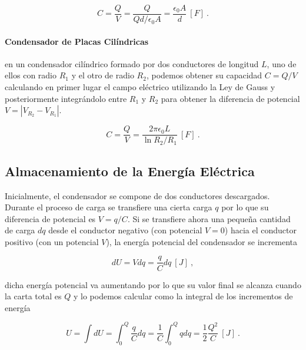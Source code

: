 \documentclass{tufte-handout}
\begin{document}
\begin{equation}
C = \frac{Q}{V} = \frac{Q}{Qd/\epsilon_0A} = \frac{\epsilon_0A}{d}~[F]~.
\end{equation}


\paragraph{Condensador de Placas Cilíndricas} en un condensador cilíndrico formado por dos conductores de longitud $L$, uno de ellos con radio $R_1$ y el otro de radio $R_2$, podemos obtener su capacidad $C = Q/V$ calculando en primer lugar el campo eléctrico utilizando la Ley de Gauss y posteriormente integrándolo entre $R_1$ y $R_2$ para obtener la diferencia de potencial $V = |V_{R_2} - V_{R_1}|$.

\begin{equation}
C = \frac{Q}{V} = \frac{2\pi\epsilon_0L}{\ln{R_2/R_1}}~[F]~.
\end{equation}

\subsection{Almacenamiento de la Energía Eléctrica}

Inicialmente, el condensador se compone de dos conductores descargados. Durante el proceso de carga se transfiere una cierta carga $q$ por lo que su diferencia de potencial es $V = q/C$. Si se transfiere ahora una pequeña cantidad de carga $dq$ desde el conductor negativo (con potencial $V=0$) hacia el conductor positivo (con un potencial $V$), la energía potencial del condensador se incrementa

\begin{equation}
dU = V dq = \frac{q}{C}dq~[J]~,
\end{equation}

dicha energía potencial va aumentando por lo que su valor final se alcanza cuando la carta total es $Q$ y lo podemos calcular como la integral de los incrementos de energía

\begin{equation}
U = \int dU = \int_0^Q \frac{q}{C}dq = \frac{1}{C}\int_0^Q qdq = \frac{1}{2}\frac{Q^2}{C}~[J]~.
\end{equation}
\end{document}

